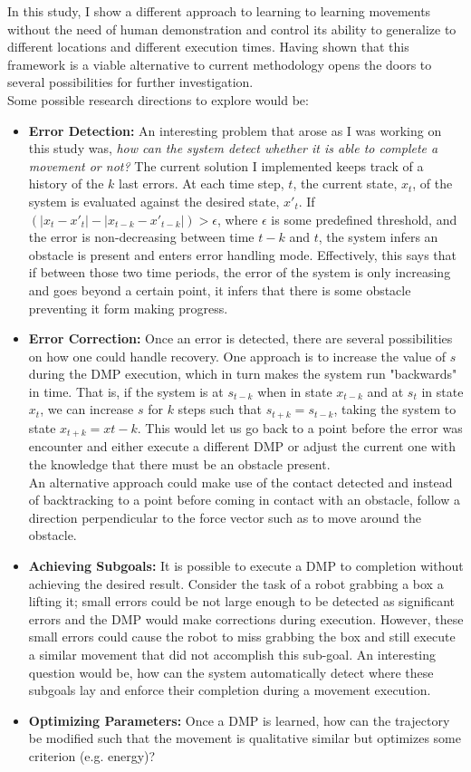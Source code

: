 \documentclass[a4paper]{article}
\begin{document}
In this study, I show a different approach to learning to learning movements without the need of human demonstration and control its ability to generalize to different locations and different execution times. Having shown that this framework is a viable alternative to current methodology opens the doors to several possibilities for further investigation. \\
\indent Some possible research directions to explore would be:
\begin{itemize}
	\item \textbf{Error Detection:} An interesting problem that arose as I was working on this study was, \textit{how can the system detect whether it is able to complete a movement or not?} The current solution I implemented keeps track of a history of the $k$ last errors. At each time step, $t$, the current state, $x_t$, of the system is evaluated against the desired state, $x'_t$. If $(|x_t - x'_t| - |x_{t-k} - x'_{t-k}|) > \epsilon$, where $\epsilon$ is some predefined threshold, and the error is non-decreasing between time $t-k$ and $t$, the system infers an obstacle is present and enters error handling mode. Effectively, this says that if between those two time periods, the error of the system is only increasing and goes beyond a certain point, it infers that there is some obstacle preventing it form making progress.
	
	\item \textbf{Error Correction:} Once an error is detected, there are several possibilities on how one could handle recovery. One approach is to increase the value of $s$ during the DMP execution, which in turn makes the system run "backwards" in time. That is, if the system is at $s_{t-k}$ when in state $x_{t-k}$ and at $s_t$ in state $x_t$, we can increase $s$ for $k$ steps such that $s_{t+k} = s_{t-k}$, taking the system to state $x_{t+k} = x{t-k}$. This would let us go back to a point before the error was encounter and either execute a different DMP or adjust the current one with the knowledge that there must be an obstacle present. \\
	\indent An alternative approach could make use of the contact detected and instead of backtracking to a point before coming in contact with an obstacle, follow a direction perpendicular to the force vector such as to move around the obstacle. 
	
	\item \textbf{Achieving Subgoals:} It is possible to execute a DMP to completion without achieving the desired result. Consider the task of a robot grabbing a box a lifting it; small errors could be not large enough to be detected as significant errors and the DMP would make corrections during execution. However, these small errors could cause the robot to miss grabbing the box and still execute a similar movement that did not accomplish this sub-goal. An interesting question would be, how can the system automatically detect where these subgoals lay and enforce their completion during a movement execution.
	
	\item \textbf{Optimizing Parameters:} Once a DMP is learned, how can the trajectory be modified such that the movement is qualitative similar but optimizes some criterion (e.g. energy)?

\end{itemize}
  
 
\end{document}
